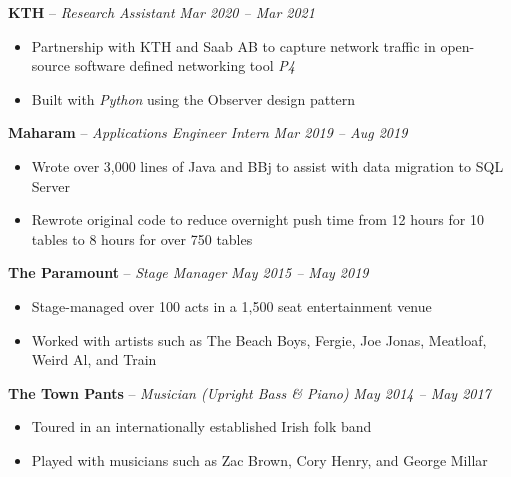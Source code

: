 \documentclass[10pt,letterpaper]{article}
\begin{document}

\headedsection
{\textbf{KTH} -- \textit{Research Assistant}}
{\textit{Mar 2020 -- Mar 2021}} {
	\begin{itemize}[noitemsep,nolistsep]
		\item Partnership with KTH and Saab AB to capture network traffic in open-source software defined networking tool \textit{P4}
		\item Built with \textit{Python} using the Observer design pattern
	\end{itemize}
}
\vspace{-1mm}

\headedsection
{\textbf{Maharam} -- \textit{Applications Engineer Intern}}
{\textit{Mar 2019 -- Aug 2019}} {
	\begin{itemize}[noitemsep,nolistsep]
		\item Wrote over 3,000 lines of Java and BBj to assist with data migration to SQL Server
		\item Rewrote original code to reduce overnight push time from 12 hours for 10 tables to 8 hours for over 750 tables
	\end{itemize}
}
\vspace{-1mm}


\headedsection
{\textbf{The Paramount} -- \textit{Stage Manager}}
{\textit{May 2015 -- May 2019}} {
	\begin{itemize}[noitemsep,nolistsep]
		\item Stage-managed over 100 acts in a 1,500 seat entertainment venue
		\item Worked with artists such as The Beach Boys, Fergie, Joe Jonas, Meatloaf, Weird Al, and Train
	\end{itemize}
}
\vspace{-1mm}


\headedsection
{\textbf{The Town Pants} -- \textit{Musician (Upright Bass \& Piano)}}
{\textit{May 2014 -- May 2017}} {
	\begin{itemize}[noitemsep,nolistsep]
		\item Toured in an internationally established Irish folk band
		\item Played with musicians such as Zac Brown, Cory Henry, and George Millar
	\end{itemize}
}
\end{document}
